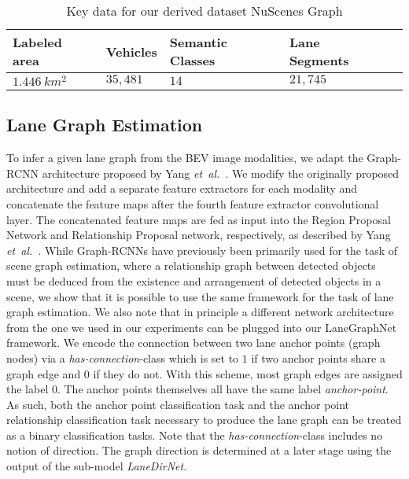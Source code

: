 \documentclass[letterpaper, 10 pt, conference]{ieeeconf}
\newcommand{\etal}{\emph{et~al.~}}
\begin{document}
\begin{table}
\centering
\caption{Key data for our derived dataset NuScenes Graph}
\label{tab:dataset-details}
\begin{tabular}{p{1.5cm}p{1cm}p{1cm}p{1.5cm}p{2cm}}
Labeled area  & Vehicles  & Semantic Classes & Lane Segments  \\
 \hline
$\SI{1.446}{km^2}$ & $35,481$ & $14$  & $21,745$  \\
\end{tabular}
\end{table}




\subsection{Lane Graph Estimation}


To infer a given lane graph from the BEV image modalities, we adapt the Graph-RCNN architecture proposed by Yang \etal \cite{yang2018graph}. We modify the originally proposed architecture and add a separate feature extractors for each modality and concatenate the feature maps after the fourth feature extractor convolutional layer. The concatenated feature maps are fed as input into the Region Proposal Network and Relationship Proposal network, respectively, as described by Yang \etal \cite{yang2018graph}. While Graph-RCNNs have previously been primarily used for the task of scene graph estimation, where a relationship graph between detected objects must be deduced from the existence and arrangement of detected objects in a scene, we show that it is possible to use the same framework for the task of lane graph estimation. We also note that in principle a different network architecture from the one we used in our experiments can be plugged into our LaneGraphNet framework. We encode the connection between two lane anchor points (graph nodes) via a \textit{has-connection}-class which is set to $1$ if two anchor points share a graph edge and $0$ if they do not. With this scheme, most graph edges are assigned the label $0$. The anchor points themselves all have the same label \textit{anchor-point}. As such, both the anchor point classification task and the anchor point relationship classification task necessary to produce the lane graph can be treated as a binary classification tasks. Note that the \textit{has-connection}-class includes no notion of direction. The graph direction is determined at a later stage using the output of the sub-model \textit{LaneDirNet}.
\end{document}
